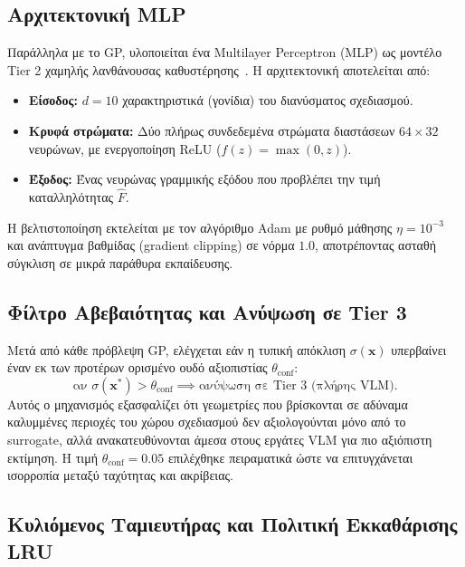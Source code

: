 \subsection{Αρχιτεκτονική MLP}
\label{subsec:impl_mlp}

Παράλληλα με το GP, υλοποιείται ένα Multilayer Perceptron (MLP) ως μοντέλο Tier 2 χαμηλής λανθάνουσας καθυστέρησης~\cite{jin2011surrogate}. Η αρχιτεκτονική αποτελείται από:
\begin{itemize}
    \item \textbf{Είσοδος:} $d = 10$ χαρακτηριστικά (γονίδια) του διανύσματος σχεδιασμού.
    \item \textbf{Κρυφά στρώματα:} Δύο πλήρως συνδεδεμένα στρώματα διαστάσεων $64 \times 32$ νευρώνων, με ενεργοποίηση ReLU ($f(z) = \max(0, z)$).
    \item \textbf{Έξοδος:} Ένας νευρώνας γραμμικής εξόδου που προβλέπει την τιμή καταλληλότητας $\hat{F}$.
\end{itemize}
Η βελτιστοποίηση εκτελείται με τον αλγόριθμο Adam με ρυθμό μάθησης $\eta = 10^{-3}$ και ανάπτυγμα βαθμίδας (gradient clipping) σε νόρμα $1.0$, αποτρέποντας ασταθή σύγκλιση σε μικρά παράθυρα εκπαίδευσης.

\subsection{Φίλτρο Αβεβαιότητας και Ανύψωση σε Tier 3}
\label{subsec:impl_uncertainty}

Μετά από κάθε πρόβλεψη GP, ελέγχεται εάν η τυπική απόκλιση $\sigma(\mathbf{x})$ υπερβαίνει έναν εκ των προτέρων ορισμένο ουδό αξιοπιστίας $\theta_{\text{conf}}$:
\begin{equation}
\label{eq:uncertainty_filter}
\text{αν } \sigma(\mathbf{x}^*) > \theta_{\text{conf}} \implies \text{ανύψωση σε Tier 3 (πλήρης VLM).}
\end{equation}
Αυτός ο μηχανισμός εξασφαλίζει ότι γεωμετρίες που βρίσκονται σε αδύναμα καλυμμένες περιοχές του χώρου σχεδιασμού δεν αξιολογούνται μόνο από το surrogate, αλλά ανακατευθύνονται άμεσα στους εργάτες VLM για πιο αξιόπιστη εκτίμηση. Η τιμή $\theta_{\text{conf}} = 0.05$ επιλέχθηκε πειραματικά ώστε να επιτυγχάνεται ισορροπία μεταξύ ταχύτητας και ακρίβειας.

\subsection{Κυλιόμενος Ταμιευτήρας και Πολιτική Εκκαθάρισης LRU}
\label{subsec:impl_sliding_window}

